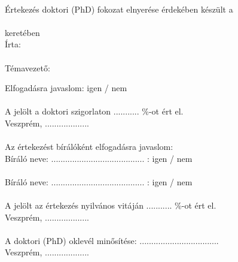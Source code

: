 \thispagestyle{plain}
\begin{center}
    {\fontsize{14}{8}\textbf{\textsc{\mytitle}}} \\[1cm]
    Értekezés doktori (PhD) fokozat elnyerése érdekében készült a \\ \myuni \\
    \myschool keretében \\[0.3cm]
    Írta:\\
    {\textbf \myauthor}\\[0.3cm]
    

    Témavezető: \mysupervisor \\[0.3cm]
\end{center}
Elfogadásra javaslom: igen / nem\\
\sig{\mysupervisor}\\[0.7cm]
A jelölt a doktori szigorlaton ........... \%-ot ért el. \\
Veszprém, ...................\\[0.7cm]
\\[0.7cm]
Az értekezést bírálóként elfogadásra javaslom: \\[0.3cm]
Bíráló neve: ........................................ : igen / nem\\
\\[0.7cm]
Bíráló neve: ........................................ : igen / nem\\
\\[0.7cm]
A jelölt az értekezés nyilvános vitáján ........... \%-ot ért el.\\
Veszprém, ...................\\[0.5cm]
\\[1cm]
A doktori (PhD) oklevél minősítése: ..................................\\
Veszprém, ...................\\[0.5cm]
\\



\newpage
\null
\thispagestyle{empty}%
\newpage 